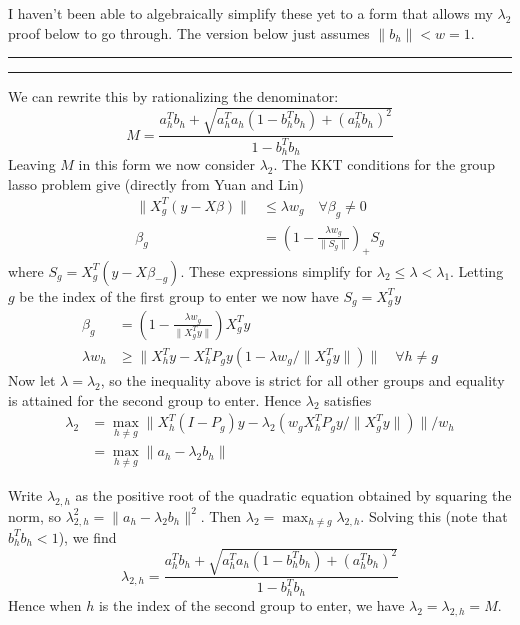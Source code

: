 \documentclass{imsart}
\newcommand{\norm}[1]{\lVert #1 \rVert}
\begin{document}
I haven't been able to algebraically simplify these yet to a form that allows my $\lambda_2$ proof below to go through. The version below just assumes $\norm{b_h} < w = 1$.

\hrule
\hrule
We can rewrite this by rationalizing the denominator:
\[
M =
\frac
{ a_h^T b_h +  \sqrt{ a_h^T a_h (1-b_h^Tb_h) + (a_h^T b_h)^2 }  }
{ 1-b_h^Tb_h }
\]
Leaving $M$ in this form we now consider $\lambda_2$. The KKT conditions for the group lasso problem give (directly from Yuan and Lin)
\begin{align*}
\norm{ X_g^T(y - X \beta) } & \leq \lambda w_g \quad \forall \beta_g \neq 0 \\
\beta_g & = \left( 1 - \frac{ \lambda w_g }{ \norm{S_g} } \right)_+ S_g
\end{align*}
where $S_g = X_g^T(y - X \beta_{-g})$. These expressions simplify for $\lambda_2 \leq \lambda < \lambda_1$. Letting $g$ be the index of the first group to enter we now have $S_g = X_g^Ty$ 
\begin{align*}
\beta_g & = \left( 1 - \frac{ \lambda w_g }{ \norm{X_g^Ty} } \right) X_g^Ty \\
\lambda w_h & \geq \norm{ X_h^Ty - X_h^T P_g y (1-\lambda w_g / \norm{X_g^Ty})  } \quad \forall h \neq g
\end{align*}
Now let $\lambda = \lambda_2$, so the inequality above is strict for all other groups and equality is attained for the second group to enter. Hence $\lambda_2$ satisfies
\begin{align*}
\lambda_2 & = \max_{h \neq g} 
\norm{ X_h^T(I - P_g) y - \lambda_2 ( w_g X_h^T P_g y / \norm{X_g^Ty} )  } / w_h\\
& = \max_{h \neq g} \norm{ a_h - \lambda_2 b_h } 
\end{align*}

Write $\lambda_{2,h}$ as the positive root of the quadratic equation obtained by squaring the norm, so $\lambda_{2,h}^2 = \norm{ a_h - \lambda_2 b_h }^2$. Then $\lambda_2 = \max_{h \neq g} \lambda_{2,h}$. Solving this (note that $b_h^Tb_h < 1$), we find
\[
\lambda_{2,h} = \frac
{ a_h^T b_h +  \sqrt{ a_h^T a_h (1-b_h^Tb_h) + (a_h^T b_h)^2 }  }
{ 1-b_h^Tb_h }
\]
Hence when $h$ is the index of the second group to enter, we have $\lambda_2 = \lambda_{2,h} = M$.
\end{document}
